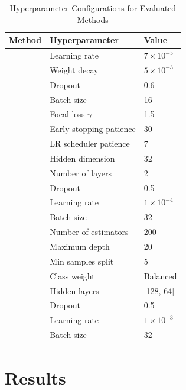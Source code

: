 \documentclass[acmtog, nonacm]{acmart}
\begin{document}
\begin{table}[h]
  \caption{Hyperparameter Configurations for Evaluated Methods}
  \label{tab:hyperparameters}
  \begin{tabular*}{\columnwidth}{@{\extracolsep{\fill}}lll@{}}
    \toprule
    Method & Hyperparameter & Value \\
    \midrule
      & Learning rate & $7 \times 10^{-5}$ \\
      & Weight decay & $5 \times 10^{-3}$ \\
      & Dropout & 0.6 \\
      & Batch size & 16 \\
      & Focal loss $\gamma$ & 1.5 \\
      & Early stopping patience & 30 \\
      & LR scheduler patience & 7 \\
    \midrule
      & Hidden dimension & 32 \\
      & Number of layers & 2 \\
      & Dropout & 0.5 \\
      & Learning rate & $1 \times 10^{-4}$ \\
      & Batch size & 32 \\
    \midrule
      & Number of estimators & 200 \\
      & Maximum depth & 20 \\
      & Min samples split & 5 \\
      & Class weight & Balanced \\
    \midrule
      & Hidden layers & [128, 64] \\
      & Dropout & 0.5 \\
      & Learning rate & $1 \times 10^{-3}$ \\
      & Batch size & 32 \\
    \bottomrule
  \end{tabular*}
\end{table}

\section{Results}
\end{document}
